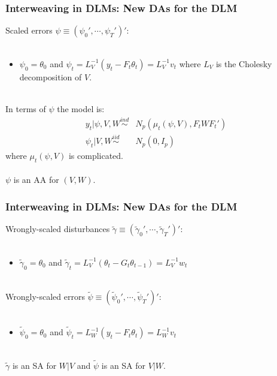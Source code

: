 \documentclass[xcolor=dvipsnames]{beamer}
\begin{document}
\begin{frame}
\frametitle{Interweaving in DLMs:  New DAs for the DLM}
Scaled errors $\psi\equiv(\psi_0',\cdots,\psi_T')'$:\\~\\
\begin{itemize}
\item[]$\psi_0=\theta_0$ and $\psi_t=L_V^{-1}(y_t - F_t\theta_t)=L_V^{-1}v_t$ where $L_V$ is the Cholesky decomposition of $V$.\\~\\
\end{itemize}
 
In terms of $\psi$ the model is:
\begin{align*}
y_t|\psi,V,W \stackrel{ind}{\sim} &N_p(\mu_t(\psi,V),F_tWF_t')\\
\psi_t|V,W \stackrel{iid}{\sim} &N_p(0,I_p)
\end{align*} 
where $\mu_t(\psi,V)$ is complicated.\\~\\

{\color{blue}$\psi$ is an AA for $(V,W)$.}
\end{frame}

\begin{frame}
\frametitle{Interweaving in DLMs: New DAs for the DLM}
Wrongly-scaled disturbances $\tilde{\gamma}\equiv(\tilde{\gamma}_0',\cdots,\tilde{\gamma}_T')'$:\\~\\
\begin{itemize}
\item[]$\tilde{\gamma}_0=\theta_0$ and $\tilde{\gamma}_t=L_V^{-1}(\theta_t - G_t\theta_{t-1})=L_V^{-1}w_t$\\~\\
\end{itemize}

Wrongly-scaled errors $\tilde{\psi}\equiv(\tilde{\psi}_0',\cdots,\tilde{\psi}_T')'$:\\~\\
\begin{itemize}
\item[]$\tilde{\psi}_0=\theta_0$ and $\tilde{\psi}_t=L_W^{-1}(y_t - F_t\theta_{t})=L_W^{-1}v_t$\\~\\
\end{itemize}

{\color{blue} $\tilde{\gamma}$ is an SA for $W|V$ and $\tilde{\psi}$ is an SA for $V|W$.}
\end{frame}
\end{document}
